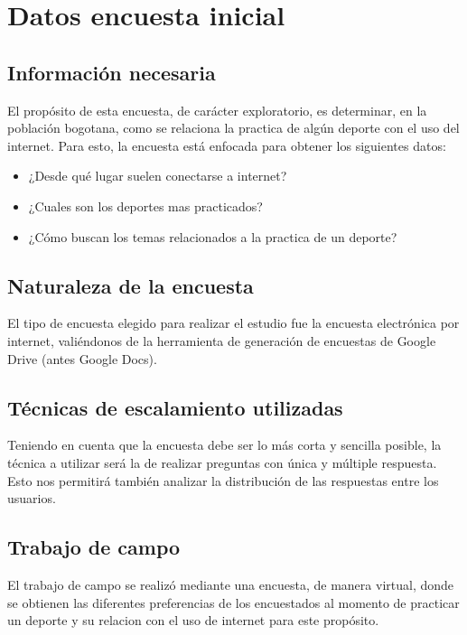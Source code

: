 \chapter{Datos encuesta inicial} 
\label{app:resultado_encuesta}

\section{Información necesaria}

El propósito de esta encuesta, de carácter exploratorio, es determinar, en la población bogotana, como se relaciona la practica de algún deporte con el uso del internet.
Para esto, la encuesta está enfocada para obtener los siguientes datos:
\begin{itemize}
  \item ¿Desde qué lugar suelen conectarse a internet?
  \item ¿Cuales son los deportes mas practicados?
  \item ¿Cómo buscan los temas relacionados a la practica de un deporte?
\end{itemize}

\section{Naturaleza de la encuesta}

El tipo de encuesta elegido para realizar el estudio fue la encuesta electrónica por internet, valiéndonos de la herramienta de generación de encuestas de Google Drive (antes Google Docs).

\section{Técnicas de escalamiento utilizadas}

Teniendo en cuenta que la encuesta debe ser lo más corta y sencilla posible, la técnica a utilizar será la de realizar preguntas con única y múltiple respuesta. Esto nos permitirá también analizar la distribución de las respuestas entre los usuarios.


\section{Trabajo de campo}

El trabajo de campo se realizó mediante una encuesta, de manera virtual, donde se obtienen las diferentes preferencias de los encuestados al momento de practicar un deporte y su relacion con el uso de internet para este propósito.

